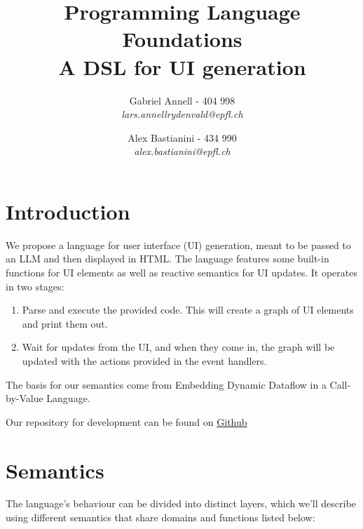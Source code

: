 \documentclass{article}
\title{
  Programming Language Foundations \\
  A DSL for UI generation
}
\author{
  Gabriel Annell - 404 998\\
  \small{\textit{lars.annellrydenvald@epfl.ch}} \and Alex Bastianini - 434 990\\
  \small{\textit{alex.bastianini@epfl.ch}}
}
\begin{document}
\maketitle
\tableofcontents

\section{Introduction}

We propose a language for user interface (UI) generation, meant to be passed to an LLM and then displayed in HTML. The language features some built-in functions for UI elements as well as reactive semantics for UI updates. It operates in two stages:

\begin{enumerate}
	\item Parse and execute the provided code. This will create a graph of UI elements and print them out.
	\item Wait for updates from the UI, and when they come in, the graph will be updated with the actions provided in the event handlers.
\end{enumerate}

\noindent The basis for our semantics come from Embedding Dynamic Dataflow in a Call-by-Value Language\cite{10.1007/11693024_20}.

Our repository for development can be found on \href{https://github.com/LGabAnnell/cs-462-project}{Github}

\section{Semantics}
The language's behaviour can be divided into distinct layers, which we'll describe using different semantics that share domains and functions listed below:
\end{document}

